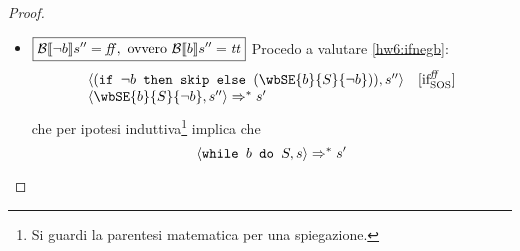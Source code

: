 {\begin{enumerate}
\begin{proof}
\begin{itemize}
\begin{itemize}
		In questo caso ottengo che:
		$$
		\begin{array}{ll}
		\confSs{\ifABC{\neg b}{\skipForFriends}{(\wbSE{b}{S}{\neg b})}}{s''} & \ifttSOS \\
		\confSs{\skipForFriends}{s''} & \skipForFriends \\
		s''
		\end{array}
		$$
		da cui per il determinismo delle regole SOS segue che $\boxed{s'' \equiv s'}$. Ma procedendo
		a valutare $\confSs{\wbS{b}{S}}{s}$ ottengo:
		$$
		\begin{array}{ll}
		\confSs{\wbS{b}{S}}{s} \Rar{} & \whileSOS \\
		\confSs{\ifABC{b}{S; \wbS{b}{S}}{\skipForFriends}}{s} & \ifttSOS \\
		\confSs{S; \wbS{b}{S}}{s} \Rar{*} & \text{Lemma di composizione applicato a \ref{hw6:Ssgoestos''}} \\
		\confSs{\wbS{b}{S}}{s''} & \whileSOS \\
		\confSs{\ifABC{b}{S; \wbS{b}{S}}{\skipForFriends}}{s''} & \ifffSOS \\
		\confSs{\skipForFriends}{s''} \Rar{} & \skipSOS \\
		s''
		\end{array}
		$$
		che era proprio ciò che bisognava dimostrare.
		\item $\boxed{\mathcal{B} \llbracket \neg b \rrbracket s'' = \mbox{\textit{ff}}, \text{ ovvero } \mathcal{B} \llbracket b \rrbracket s'' = \mbox{\textit{tt}}}$
		Procedo a valutare \ref{hw6:ifnegb}:
		$$
		\begin{array}{ll}
		\confSs{(\ifABC{\neg b}{\skipForFriends}{(\wbSE{b}{S}{\neg b})})}{s''} & \ifffSOS\\
		\confSs{\wbSE{b}{S}{\neg b}}{s''} \Rar{*} s'
		\end{array}
		$$
		che per ipotesi induttiva\footnote{Si guardi la parentesi matematica per una spiegazione.} implica che
		$$
		\langle{}\mbox{\normalfont{\texttt{while }}} b \textrm{\normalfont{\texttt{ do }}} S, s\rangle{} \Rightarrow^{*} s'
		$$
	\end{itemize}
	

\end{itemize}
\end{proof}
\end{enumerate}}
